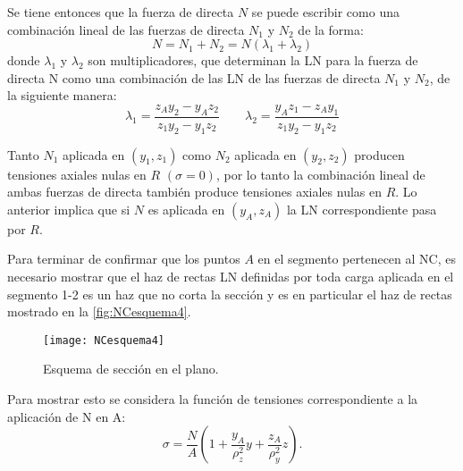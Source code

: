 Se tiene entonces que la fuerza de directa $N$ se puede escribir como una combinación lineal de las fuerzas de directa $N_1$ y $N_2$ de la forma:
$$
N=N_1+N_2=N(\lambda_1+\lambda_2)
$$
donde $\lambda_1$ y $\lambda_2$ son multiplicadores, que determinan la LN para la fuerza de directa N como una combinación de las LN de las fuerzas de directa $N_1$ y $N_2$, de la siguiente manera:
\begin{equation}
\lambda_1=\frac{z_Ay_2-y_Az_2}{z_1y_2-y_1z_2}
\qquad
\lambda_2=\frac{y_Az_1-z_Ay_1}{z_1y_2-y_1z_2}
\end{equation}

Tanto $N_1$ aplicada en $(y_1,z_1)$ como $N_2$ aplicada en $(y_2,z_2)$ producen tensiones axiales nulas en $R$ $(\sigma=0)$, por lo tanto la combinación lineal de ambas fuerzas de directa también produce tensiones axiales nulas en $R$. Lo anterior implica que si $N$ es aplicada en $(y_A,z_A)$ la LN correspondiente pasa por $R$. 

Para terminar de confirmar que los puntos $A$ en el segmento pertenecen al NC, es necesario mostrar que el haz de rectas LN definidas por toda carga aplicada en el segmento 1-2 es un haz que no corta la sección y es en particular el haz de rectas mostrado en la \autoref{fig:NCesquema4}.

\begin{figure}[htb]
	\centering
	\texttt{[image: NCesquema4]}
	\caption{Esquema de sección en el plano.}
	\label{fig:NCesquema4}
\end{figure}
%

Para mostrar esto se considera la función de tensiones correspondiente a la aplicación de N en A:
%
\begin{equation}\label{eqn:sigmatotal}
\sigma = \frac{N}{A} \left( 1 + \frac{y_A}{\rho_z^2} y + \frac{z_A}{\rho_y^2} z \right).
\end{equation}


